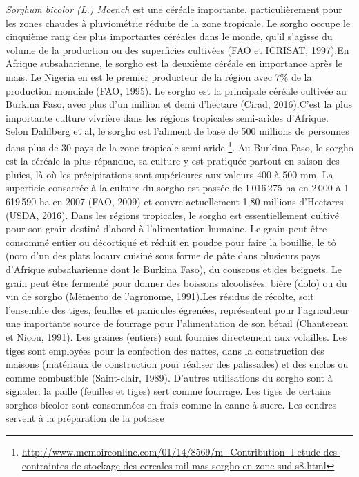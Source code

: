 \documentclass[a4paper,11pt]{article}
\begin{document}
\emph{Sorghum bicolor (L.) Moench} est une céréale importante,
particulièrement pour les zones chaudes à pluviométrie réduite de la
zone tropicale. Le sorgho occupe le cinquième rang des plus
importantes céréales dans le monde, qu’il s’agisse du volume de la
production ou des superficies cultivées (FAO et ICRISAT, 1997).En
Afrique subsaharienne, le sorgho est la deuxième céréale en importance
après le maïs. Le Nigeria en est le premier producteur de la région
avec 7\% de la production mondiale (FAO, 1995). Le sorgho est la
principale céréale cultivée au Burkina Faso, avec plus d’un million et
demi d’hectare (Cirad, 2016).C’est la plus importante culture vivrière
dans les régions tropicales semi-arides d’Afrique. Selon Dahlberg et
al, le sorgho est l’aliment de base de 500 millions de personnes dans
plus de 30 pays de la zone tropicale semi-aride
\footnote{\url{http://www.memoireonline.com/01/14/8569/m_Contribution--l-etude-des-contraintes-de-stockage-des-cereales-mil-mas-sorgho-en-zone-sud-s8.html}}.
Au Burkina Faso, le sorgho est la céréale la plus répandue, sa culture
y est pratiquée partout en saison des pluies, là où les précipitations
sont supérieures aux valeurs 400 à 500 mm. La superficie consacrée à
la culture du sorgho est passée de 1\,016\,275 ha en 2\,000 à 1\,619\,590 ha
en 2007 (FAO, 2009) et couvre actuellement 1,80 millions d’Hectares
(USDA, 2016). Dans les régions tropicales, le sorgho est
essentiellement cultivé pour son grain destiné d’abord à
l’alimentation humaine. Le grain peut être consommé entier ou
décortiqué et réduit en poudre pour faire la bouillie, le tô (nom d’un
des plats locaux cuisiné sous forme de pâte dans plusieurs pays
d’Afrique subsaharienne dont le Burkina Faso), du couscous et des
beignets. Le grain peut être fermenté pour donner des boissons
alcoolisées: bière (dolo) ou du vin de sorgho (Mémento de l’agronome,
1991).Les résidus de récolte, soit l’ensemble des tiges, feuilles et
panicules égrenées, représentent pour l’agriculteur une importante
source de fourrage pour l’alimentation de son bétail (Chantereau et
Nicou, 1991). Les graines (entiers) sont fournies directement aux
volailles. Les tiges sont employées pour la confection des nattes,
dans la construction des maisons (matériaux de construction pour
réaliser des palissades) et des enclos ou comme combustible
(Saint-clair, 1989). D’autres utilisations du sorgho sont à signaler:
la paille (feuilles et tiges) sert comme fourrage. Les tiges de
certains sorghos bicolor sont consommées en frais comme la canne à
sucre. Les cendres servent à la préparation de la potasse
\end{document}
